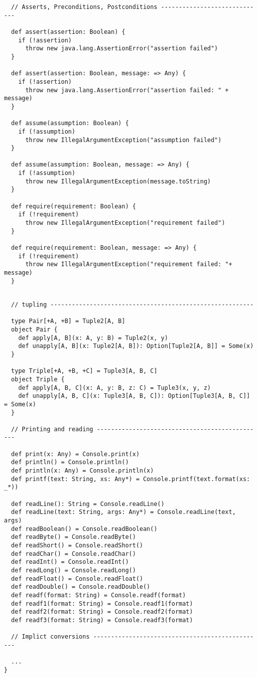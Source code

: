 \begin{lstlisting}
  // Asserts, Preconditions, Postconditions -----------------------------

  def assert(assertion: Boolean) {
    if (!assertion)
      throw new java.lang.AssertionError("assertion failed")
  }

  def assert(assertion: Boolean, message: => Any) {
    if (!assertion)
      throw new java.lang.AssertionError("assertion failed: " + message)
  }

  def assume(assumption: Boolean) {
    if (!assumption)
      throw new IllegalArgumentException("assumption failed")
  }

  def assume(assumption: Boolean, message: => Any) {
    if (!assumption)
      throw new IllegalArgumentException(message.toString)
  }

  def require(requirement: Boolean) {
    if (!requirement)
      throw new IllegalArgumentException("requirement failed")
  }

  def require(requirement: Boolean, message: => Any) {
    if (!requirement)
      throw new IllegalArgumentException("requirement failed: "+ message)
  }
  \end{lstlisting}
\newpage
\begin{lstlisting}

  // tupling ---------------------------------------------------------

  type Pair[+A, +B] = Tuple2[A, B]
  object Pair {
    def apply[A, B](x: A, y: B) = Tuple2(x, y)
    def unapply[A, B](x: Tuple2[A, B]): Option[Tuple2[A, B]] = Some(x)
  }

  type Triple[+A, +B, +C] = Tuple3[A, B, C]
  object Triple {
    def apply[A, B, C](x: A, y: B, z: C) = Tuple3(x, y, z)
    def unapply[A, B, C](x: Tuple3[A, B, C]): Option[Tuple3[A, B, C]] = Some(x)
  }

  // Printing and reading -----------------------------------------------

  def print(x: Any) = Console.print(x)
  def println() = Console.println()
  def println(x: Any) = Console.println(x)
  def printf(text: String, xs: Any*) = Console.printf(text.format(xs: _*))

  def readLine(): String = Console.readLine()
  def readLine(text: String, args: Any*) = Console.readLine(text, args)
  def readBoolean() = Console.readBoolean()
  def readByte() = Console.readByte()
  def readShort() = Console.readShort()
  def readChar() = Console.readChar()
  def readInt() = Console.readInt()
  def readLong() = Console.readLong()
  def readFloat() = Console.readFloat()
  def readDouble() = Console.readDouble()
  def readf(format: String) = Console.readf(format)
  def readf1(format: String) = Console.readf1(format)
  def readf2(format: String) = Console.readf2(format)
  def readf3(format: String) = Console.readf3(format)

  // Implict conversions ------------------------------------------------

  ...
}
\end{lstlisting}

